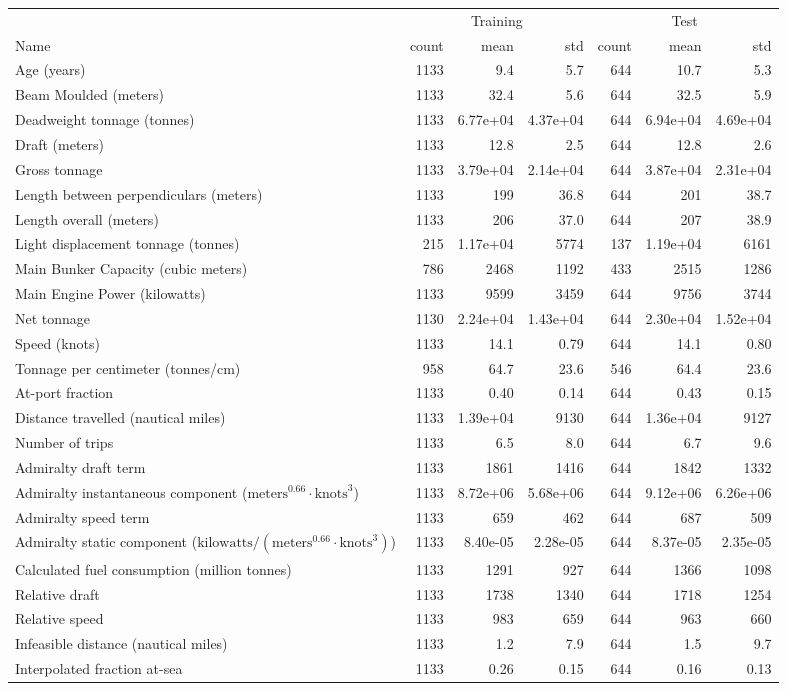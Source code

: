 
\begin{tabular}[t]{lrrrrrr}
\toprule
\multicolumn{1}{c}{ } & \multicolumn{3}{c}{Training} & \multicolumn{3}{c}{Test} \\
\cmidrule(l{3pt}r{3pt}){2-4} \cmidrule(l{3pt}r{3pt}){5-7}
Name & count & mean & std & count & mean & std\\
\midrule
Age (years) & 1133 & 9.4 & 5.7 & 644 & 10.7 & 5.3\\
Beam Moulded (meters) & 1133 & 32.4 & 5.6 & 644 & 32.5 & 5.9\\
Deadweight tonnage (tonnes) & 1133 & 6.77e+04 & 4.37e+04 & 644 & 6.94e+04 & 4.69e+04\\
Draft (meters) & 1133 & 12.8 & 2.5 & 644 & 12.8 & 2.6\\
Gross tonnage & 1133 & 3.79e+04 & 2.14e+04 & 644 & 3.87e+04 & 2.31e+04\\
\addlinespace
Length between perpendiculars (meters) & 1133 & 199 & 36.8 & 644 & 201 & 38.7\\
Length overall (meters) & 1133 & 206 & 37.0 & 644 & 207 & 38.9\\
Light displacement tonnage (tonnes) & 215 & 1.17e+04 & 5774 & 137 & 1.19e+04 & 6161\\
Main Bunker Capacity (cubic meters) & 786 & 2468 & 1192 & 433 & 2515 & 1286\\
Main Engine Power (kilowatts) & 1133 & 9599 & 3459 & 644 & 9756 & 3744\\
\addlinespace
Net tonnage & 1130 & 2.24e+04 & 1.43e+04 & 644 & 2.30e+04 & 1.52e+04\\
Speed (knots) & 1133 & 14.1 & 0.79 & 644 & 14.1 & 0.80\\
Tonnage per centimeter (tonnes/cm) & 958 & 64.7 & 23.6 & 546 & 64.4 & 23.6\\
At-port fraction & 1133 & 0.40 & 0.14 & 644 & 0.43 & 0.15\\
Distance travelled (nautical miles) & 1133 & 1.39e+04 & 9130 & 644 & 1.36e+04 & 9127\\
\addlinespace
Number of trips & 1133 & 6.5 & 8.0 & 644 & 6.7 & 9.6\\
Admiralty draft term & 1133 & 1861 & 1416 & 644 & 1842 & 1332\\
Admiralty instantaneous component ($\text{meters}^{0.66} \cdot \text{knots}^3$) & 1133 & 8.72e+06 & 5.68e+06 & 644 & 9.12e+06 & 6.26e+06\\
Admiralty speed term & 1133 & 659 & 462 & 644 & 687 & 509\\
Admiralty static component ($\text{kilowatts}/(\text{meters}^{0.66} \cdot \text{knots}^3)$) & 1133 & 8.40e-05 & 2.28e-05 & 644 & 8.37e-05 & 2.35e-05\\
\addlinespace
Calculated fuel consumption (million tonnes) & 1133 & 1291 & 927 & 644 & 1366 & 1098\\
Relative draft & 1133 & 1738 & 1340 & 644 & 1718 & 1254\\
Relative speed & 1133 & 983 & 659 & 644 & 963 & 660\\
Infeasible distance (nautical miles) & 1133 & 1.2 & 7.9 & 644 & 1.5 & 9.7\\
Interpolated fraction at-sea & 1133 & 0.26 & 0.15 & 644 & 0.16 & 0.13\\
\bottomrule
\end{tabular}
